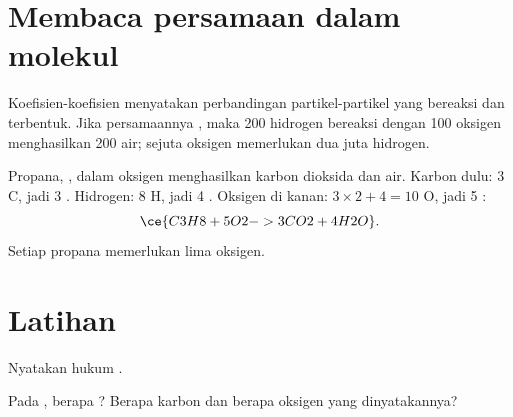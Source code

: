 \section{Membaca persamaan dalam molekul}


\begin{proposition}\label{prop:g8:balanced-equations:molecules}
Koefisien-koefisien  menyatakan perbandingan
partikel-partikel yang bereaksi dan terbentuk. Jika persamaannya
, maka 200  hidrogen bereaksi dengan 100
 oksigen menghasilkan 200  air; sejuta  oksigen
memerlukan dua juta  hidrogen.
\end{proposition}

\begin{example}\label{ex:g8:balanced-equations:propane}
Propana, ,  dalam oksigen menghasilkan karbon dioksida
dan air. Karbon dulu: 3 C, jadi 3 . Hidrogen: 8 H, jadi 4
. Oksigen di kanan: $3 \times 2 + 4 = 10$ O, jadi 5 :
\[
  \ce{C3H8 + 5O2 -> 3CO2 + 4H2O}.
\]
Setiap  propana memerlukan lima  oksigen.
\end{example}

\section{Latihan}

\begin{exercise}[$\star$]\label{exo:g8:balanced-equations:1}
Nyatakan hukum .
\end{exercise}

\begin{exercise}[$\star$]\label{exo:g8:balanced-equations:2}
Pada , berapa ? Berapa  karbon
dan berapa  oksigen yang dinyatakannya?
\end{exercise}

